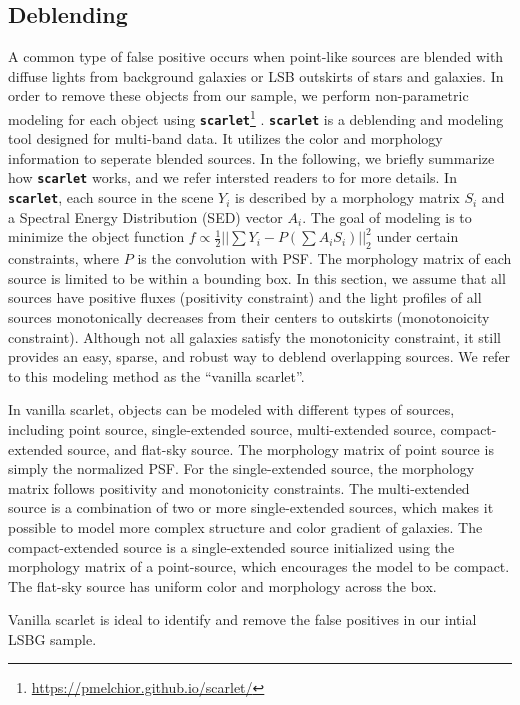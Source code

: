 \documentclass[twocolumn,astrosymb,twocolappendix]{aastex631}
\newcommand{\code}[1]{\textbf{\texttt{#1}}}
\begin{document}
\begin{CJK*}{UTF8}{gbsn}
\subsection{Deblending}\label{sec:deblending}
A common type of false positive occurs when point-like sources are blended with diffuse lights from background galaxies or LSB outskirts of  stars and galaxies. In order to remove these objects from our sample, we perform non-parametric modeling for  each object using \code{scarlet}\footnote{\url{https://pmelchior.github.io/scarlet/}} \citep{Melchior2018}. \code{scarlet} is a deblending and modeling tool designed for multi-band data. It utilizes the color and morphology information to seperate blended sources. In the following, we briefly summarize how \code{scarlet} works, and we refer intersted readers to \citet{Melchior2018} for more details. In \code{scarlet}, each source in the scene $Y_i$ is described by a morphology matrix $S_i$ and a Spectral Energy Distribution (SED) vector $A_i$. The goal of modeling is to minimize the object function $f \propto \frac{1}{2}||\sum Y_i - P(\sum A_i S_i)||_2^{2}$ under certain constraints, where $P$ is the convolution with PSF. The morphology matrix of each source is limited to be within a bounding box. In this section, we assume that all sources have positive fluxes (positivity constraint) and the light profiles of all sources monotonically decreases from their centers to outskirts (monotonoicity constraint). Although not all galaxies satisfy the monotonicity constraint, it still provides an easy, sparse, and robust way to deblend overlapping sources. We refer to this modeling method as the ``vanilla scarlet''. 

In vanilla scarlet, objects can be modeled with different types of sources, including point source, single-extended source, multi-extended source, compact-extended source, and flat-sky source. The morphology matrix of point source is simply the normalized PSF. For the single-extended source, the morphology matrix follows positivity and monotonicity constraints. The multi-extended source is a combination of two or more single-extended sources, which makes it possible to model more complex structure and color gradient of galaxies. The compact-extended source is a single-extended source initialized using the morphology matrix of a point-source, which encourages the model to be compact. The flat-sky source has uniform color and morphology across the box.

Vanilla scarlet is ideal to identify and remove the false positives in our intial LSBG sample. 


\end{CJK*}
\end{document}
